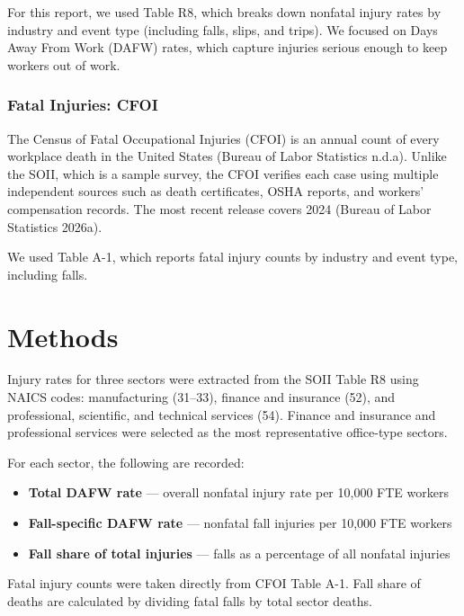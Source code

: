 \documentclass[
  letterpaper,
  DIV=11,
  numbers=noendperiod]{scrreprt}
\providecommand{\tightlist}{%
  \setlength{\itemsep}{0pt}\setlength{\parskip}{0pt}}\usepackage{longtable,booktabs,array}
\begin{document}
For this report, we used Table R8, which breaks down nonfatal injury
rates by industry and event type (including falls, slips, and trips). We
focused on Days Away From Work (DAFW) rates, which capture injuries
serious enough to keep workers out of work.

\subsection{Fatal Injuries: CFOI}\label{fatal-injuries-cfoi}

The Census of Fatal Occupational Injuries (CFOI) is an annual count of
every workplace death in the United States (Bureau of Labor Statistics
n.d.a). Unlike the SOII, which is a sample survey, the CFOI verifies
each case using multiple independent sources such as death certificates,
OSHA reports, and workers' compensation records. The most recent release
covers 2024 (Bureau of Labor Statistics 2026a).

We used Table A-1, which reports fatal injury counts by industry and
event type, including falls.


\chapter{Methods}\label{methods}

Injury rates for three sectors were extracted from the SOII Table R8
using NAICS codes: manufacturing (31--33), finance and insurance (52),
and professional, scientific, and technical services (54). Finance and
insurance and professional services were selected as the most
representative office-type sectors.

For each sector, the following are recorded:

\begin{itemize}
\tightlist
\item
  \textbf{Total DAFW rate} --- overall nonfatal injury rate per 10,000
  FTE workers
\item
  \textbf{Fall-specific DAFW rate} --- nonfatal fall injuries per 10,000
  FTE workers
\item
  \textbf{Fall share of total injuries} --- falls as a percentage of all
  nonfatal injuries
\end{itemize}

Fatal injury counts were taken directly from CFOI Table A-1. Fall share
of deaths are calculated by dividing fatal falls by total sector deaths.
\end{document}
